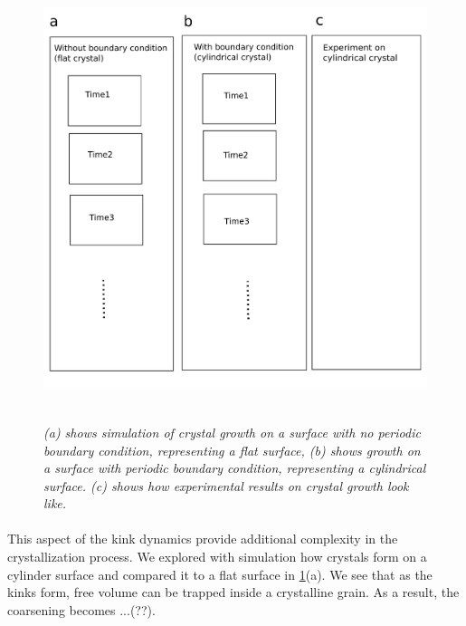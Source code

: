 \documentclass[12pt]{article}
\begin{document}
\begin{figure}[!ht]
	\setcounter{topnumber}{1}
	\setcounter{bottomnumber}{1}
	\setcounter{totalnumber}{1}
	\renewcommand{\topfraction}{0.95}
	\renewcommand{\bottomfraction}{0.95}
	\renewcommand{\textfraction}{0.15}
	\renewcommand{\floatpagefraction}{0.9}
    \centering
    \includegraphics[width = 13cm, height = 13cm]{fig5-new}
    \caption{\textit{ (a) shows simulation of crystal growth on a surface with no periodic boundary condition, representing a flat surface, (b) shows growth on a surface with periodic boundary condition, representing a cylindrical surface. (c) shows how experimental results on crystal growth look like. }
    \label{fig5:cylinder-vs-flat}}
\end{figure}

\paragraph{}

This aspect of the kink dynamics provide additional complexity in the crystallization process. We explored with simulation how crystals form on a cylinder surface and compared it to a flat surface in \ref{fig5:cylinder-vs-flat}(a). We see that as the kinks form, free volume can be trapped inside a crystalline grain. As a result, the coarsening becomes ...(??).
\end{document}
